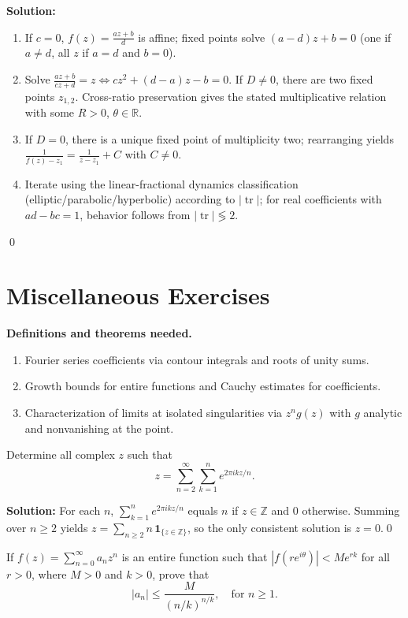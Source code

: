 \noindent\textbf{Solution:}
\begin{enumerate}[label=(\alph*)]
\item If $c=0$, $f(z)=\frac{a z+b}{d}$ is affine; fixed points solve $(a-d)z+b=0$ (one if $a\ne d$, all $z$ if $a=d$ and $b=0$).
\item Solve $\frac{a z+b}{c z+d}=z\iff c z^2+(d-a)z-b=0$. If $D\ne0$, there are two fixed points $z_{1,2}$. Cross-ratio preservation gives the stated multiplicative relation with some $R>0$, $\theta\in\mathbb R$.
\item If $D=0$, there is a unique fixed point of multiplicity two; rearranging yields $\frac{1}{f(z)-z_1}=\frac{1}{z-z_1}+C$ with $C\ne0$.
\item Iterate using the linear-fractional dynamics classification (elliptic/parabolic/hyperbolic) according to $|\operatorname{tr}|$; for real coefficients with $ad-bc=1$, behavior follows from $|\operatorname{tr}|\lessgtr2$.
\end{enumerate}\qed
\section{Miscellaneous Exercises}

\noindent\textbf{Definitions and theorems needed.}
\begin{enumerate}[label=(\alph*)]
\item Fourier series coefficients via contour integrals and roots of unity sums.
\item Growth bounds for entire functions and Cauchy estimates for coefficients.
\item Characterization of limits at isolated singularities via $z^n g(z)$ with $g$ analytic and nonvanishing at the point.
\end{enumerate}



\begin{problembox}
Determine all complex \( z \) such that
\[ z = \sum_{n=2}^{\infty} \sum_{k=1}^{n} e^{2\pi i k z / n}. \]
\end{problembox}

\noindent\textbf{Solution:}
For each $n$, $\sum_{k=1}^n e^{2\pi i k z/n}$ equals $n$ if $z\in\mathbb Z$ and $0$ otherwise. Summing over $n\ge2$ yields $z=\sum_{n\ge2} n\,\mathbf 1_{\{z\in\mathbb Z\}}$, so the only consistent solution is $z=0$.\qed


\begin{problembox}
If \( f(z) = \sum_{n=0}^{\infty} a_n z^n \) is an entire function such that \( |f(r e^{i\theta})| < M e^{r k} \) for all \( r > 0 \), where \( M > 0 \) and \( k > 0 \), prove that
\[ |a_n| \leq \frac{M}{(n/k)^{n/k}}, \quad \text{for } n \geq 1. \]
\end{problembox}

